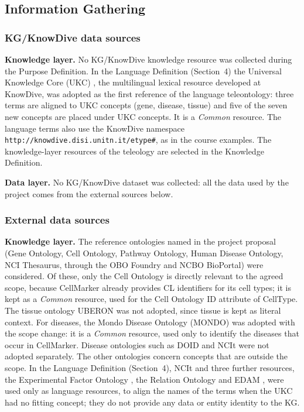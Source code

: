 \subsection{Information Gathering}
\label{sec:info-gathering}

\subsubsection{KG/KnowDive data sources}

\medskip\noindent\textbf{Knowledge layer.} No KG/KnowDive knowledge resource was collected during the Purpose Definition. In the Language Definition (Section~4) the Universal Knowledge Core (UKC) \cite{giunchiglia2017understanding}, the multilingual lexical resource developed at KnowDive, was adopted as the first reference of the language teleontology: three terms are aligned to UKC concepts (gene, disease, tissue) and five of the seven new concepts are placed under UKC concepts. It is a \emph{Common} resource. The language terms also use the KnowDive namespace \texttt{http://knowdive.disi.unitn.it/etype\#}, as in the course examples. The knowledge-layer resources of the teleology are selected in the Knowledge Definition.

\medskip\noindent\textbf{Data layer.} No KG/KnowDive dataset was collected: all the data used by the project comes from the external sources below.

\subsubsection{External data sources}

\medskip\noindent\textbf{Knowledge layer.} The reference ontologies named in the project proposal (Gene Ontology, Cell Ontology, Pathway Ontology, Human Disease Ontology, NCI Thesaurus, through the OBO Foundry and NCBO BioPortal) were considered. Of these, only the Cell Ontology is directly relevant to the agreed scope, because CellMarker already provides CL identifiers for its cell types; it is kept as a \emph{Common} resource, used for the Cell Ontology ID attribute of CellType. The tissue ontology UBERON was not adopted, since tissue is kept as literal context. For diseases, the Mondo Disease Ontology (MONDO) \cite{vasilevsky2026mondo} was adopted with the scope change: it is a \emph{Common} resource, used only to identify the diseases that occur in CellMarker. Disease ontologies such as DOID and NCIt were not adopted separately. The other ontologies concern concepts that are outside the scope. In the Language Definition (Section~4), NCIt \cite{sioutos2007nci} and three further resources, the Experimental Factor Ontology \cite{malone2010modeling}, the Relation Ontology \cite{smith2005relations} and EDAM \cite{ison2013edam}, were used only as language resources, to align the names of the terms when the UKC had no fitting concept; they do not provide any data or entity identity to the KG.

